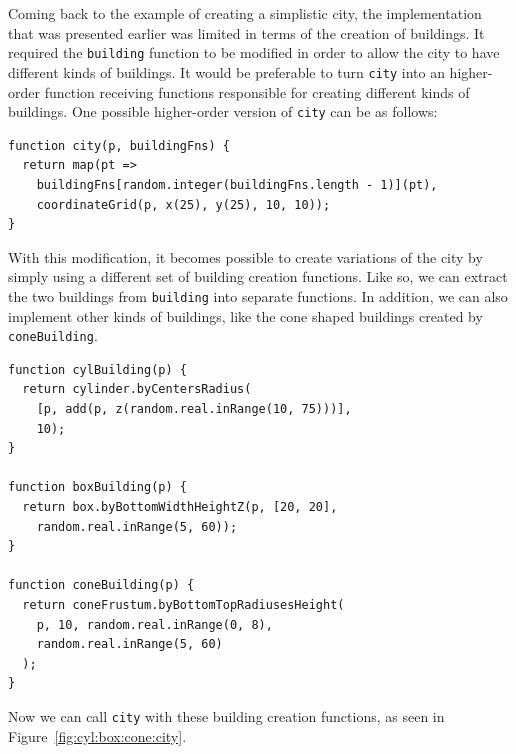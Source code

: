 Coming back to the example of creating a simplistic city, the implementation that was presented earlier was limited in terms of the creation of buildings.
It required the {\tt building} function to be modified in order to allow the city to have different kinds of buildings.
It would be preferable to turn {\tt city} into an higher-order function receiving functions responsible for creating different kinds of buildings.
One possible higher-order version of {\tt city} can be as follows:

\begin{verbatim}
function city(p, buildingFns) {
  return map(pt =>
    buildingFns[random.integer(buildingFns.length - 1)](pt),
    coordinateGrid(p, x(25), y(25), 10, 10));
}
\end{verbatim}

With this modification, it becomes possible to create variations of the city by simply using a different set of building creation functions.
Like so, we can extract the two buildings from {\tt building} into separate functions.
In addition, we can also implement other kinds of buildings, like the cone shaped buildings created by {\tt coneBuilding}.

\begin{verbatim}
function cylBuilding(p) {
  return cylinder.byCentersRadius(
    [p, add(p, z(random.real.inRange(10, 75)))],
    10);
}

function boxBuilding(p) {
  return box.byBottomWidthHeightZ(p, [20, 20],
    random.real.inRange(5, 60));
}

function coneBuilding(p) {
  return coneFrustum.byBottomTopRadiusesHeight(
    p, 10, random.real.inRange(0, 8),
    random.real.inRange(5, 60)
  );
}
\end{verbatim}

Now we can call {\tt city} with these building creation functions, as seen in Figure~\ref{fig:cyl:box:cone:city}.

